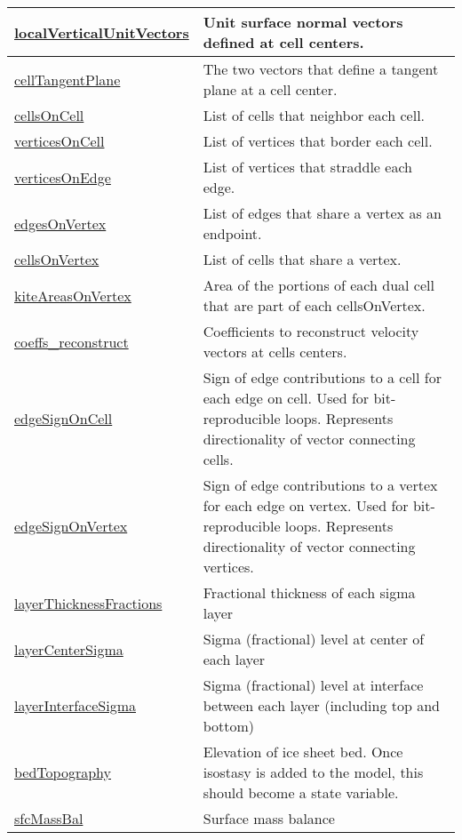 {\begin{center}
\begin{longtable}{| p{2.0in} | p{4.0in} |}
	\hyperref[subsec:var_sec_mesh_localVerticalUnitVectors]{localVerticalUnitVectors} & Unit surface normal vectors defined at cell centers. \\
	\hline
	\hyperref[subsec:var_sec_mesh_cellTangentPlane]{cellTangentPlane} & The two vectors that define a tangent plane at a cell center. \\
	\hline
	\hyperref[subsec:var_sec_mesh_cellsOnCell]{cellsOnCell} & List of cells that neighbor each cell. \\
	\hline
	\hyperref[subsec:var_sec_mesh_verticesOnCell]{verticesOnCell} & List of vertices that border each cell. \\
	\hline
	\hyperref[subsec:var_sec_mesh_verticesOnEdge]{verticesOnEdge} & List of vertices that straddle each edge. \\
	\hline
	\hyperref[subsec:var_sec_mesh_edgesOnVertex]{edgesOnVertex} & List of edges that share a vertex as an endpoint. \\
	\hline
	\hyperref[subsec:var_sec_mesh_cellsOnVertex]{cellsOnVertex} & List of cells that share a vertex. \\
	\hline
	\hyperref[subsec:var_sec_mesh_kiteAreasOnVertex]{kiteAreasOnVertex} & Area of the portions of each dual cell that are part of each cellsOnVertex. \\
	\hline
	\hyperref[subsec:var_sec_mesh_coeffs_reconstruct]{coeffs\_reconstruct} & Coefficients to reconstruct velocity vectors at cells centers. \\
	\hline
	\hyperref[subsec:var_sec_mesh_edgeSignOnCell]{edgeSignOnCell} & Sign of edge contributions to a cell for each edge on cell. Used for bit-reproducible loops. Represents directionality of vector connecting cells. \\
	\hline
	\hyperref[subsec:var_sec_mesh_edgeSignOnVertex]{edgeSignOnVertex} & Sign of edge contributions to a vertex for each edge on vertex. Used for bit-reproducible loops. Represents directionality of vector connecting vertices. \\
	\hline
	\hyperref[subsec:var_sec_mesh_layerThicknessFractions]{layerThicknessFractions} & Fractional thickness of each sigma layer \\
	\hline
	\hyperref[subsec:var_sec_mesh_layerCenterSigma]{layerCenterSigma} & Sigma (fractional) level at center of each layer \\
	\hline
	\hyperref[subsec:var_sec_mesh_layerInterfaceSigma]{layerInterfaceSigma} & Sigma (fractional) level at interface between each layer (including top and bottom) \\
	\hline
	\hyperref[subsec:var_sec_mesh_bedTopography]{bedTopography} & Elevation of ice sheet bed.  Once isostasy is added to the model, this should become a state variable. \\
	\hline
	\hyperref[subsec:var_sec_mesh_sfcMassBal]{sfcMassBal} & Surface mass balance \\
	\hline
\end{longtable}
\end{center}
}
